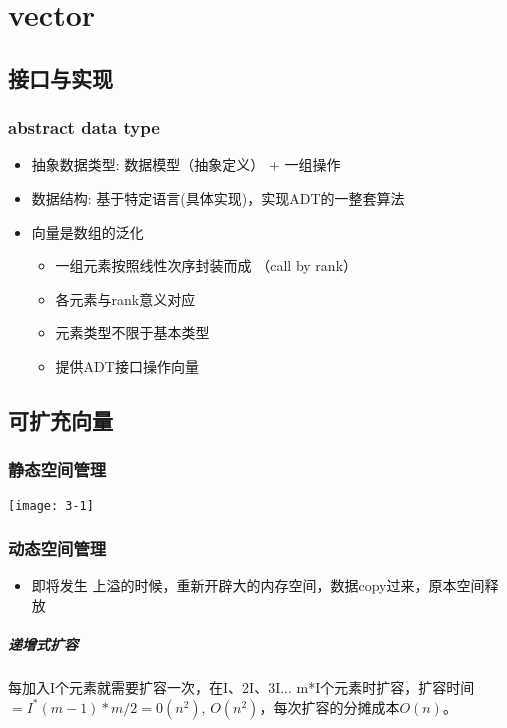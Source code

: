 \chapter{vector}
\section{接口与实现}

\subsection{abstract data type}
\begin{itemize}
\item 抽象数据类型: 数据模型（抽象定义） + 一组操作
\item 数据结构: 基于特定语言(具体实现)，实现ADT的一整套算法
\item 向量是数组的泛化
\begin{itemize}
\item 一组元素按照线性次序封装而成 （call by rank）
\item 各元素与rank意义对应
\item 元素类型不限于基本类型
\item 提供ADT接口操作向量
\end{itemize}
\end{itemize}

\section{可扩充向量}
\subsection{静态空间管理}
\texttt{[image: 3-1]}

\subsection{动态空间管理}
\begin{itemize}
\item 即将发生{\color{red} 上溢}的时候，重新开辟大的内存空间，数据copy过来，原本空间释放\\
\end{itemize}

\paragraph{递增式扩容}
每加入I个元素就需要扩容一次，在I、2I、3I... m*I个元素时扩容，扩容时间$=I^{*}(m-1) * m / 2=0\left(n^{2}\right)$, $O(n^2)$，每次扩容的分摊成本$O(n)$。


